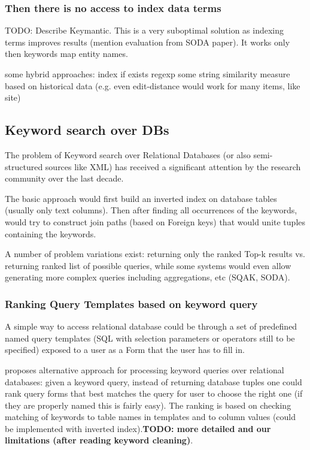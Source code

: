 \documentclass[a4paper,11pt,draft]{article}
\begin{document}
\subsubsection*{Then there is no access to index data terms}
{\color{red} TODO: Describe Keymantic\cite{Keymantic10}. This is a very suboptimal solution as indexing terms improves results (mention evaluation from SODA paper). It works only then keywords map entity names.

some hybrid approaches: 
index if exists
regexp
some string similarity measure based on historical data (e.g. even edit-distance would work for many items, like site)}



\subsection{Keyword search over DBs}
The problem of Keyword search over Relational Databases (or also semi-structured sources like XML) has received a significant attention by the research community over the last decade. 

The basic approach would first build an inverted index on database tables (usually only text columns). Then after finding all occurrences of the keywords, would try to construct join paths (based on Foreign keys) that would unite tuples containing the keywords.

% 
A number of problem variations exist:  returning only the ranked Top-k results vs. returning ranked list of possible queries, while some systems would even allow generating more complex queries including aggregations, etc (SQAK, SODA\cite{ethz2012}).

\subsubsection*{Ranking Query Templates based on keyword query}
A simple way to access relational database could  be through a set of predefined named query templates (SQL with selection parameters or operators still to be specified) exposed to a user as a Form that the user has to fill in.

\cite{forms_kws} proposes alternative approach for processing keyword queries over relational databases: given a keyword query, instead of returning database tuples one could rank query forms that best matches the query for user to choose the right one (if they are properly named this is fairly easy). The ranking is based on checking matching of keywords to table names in templates and to column values (could be implemented with inverted index).\textbf{\color{red}TODO: more detailed and our limitations (after reading keyword cleaning)}.
\end{document}
